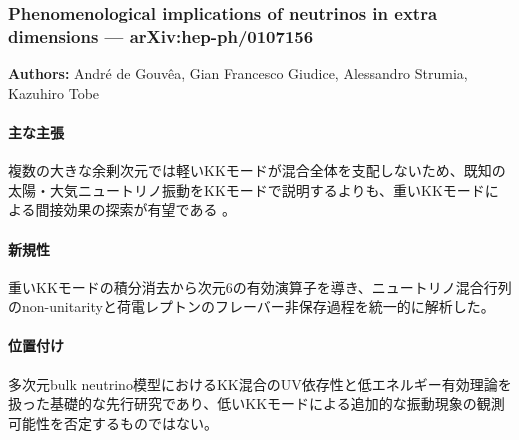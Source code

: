 \subsubsection{Phenomenological implications of neutrinos in extra dimensions --- arXiv:hep-ph/0107156}

\textbf{Authors:} Andr\'e de Gouv\^ea, Gian Francesco Giudice, Alessandro Strumia, Kazuhiro Tobe

\paragraph{主な主張}
複数の大きな余剰次元では軽いKKモードが混合全体を支配しないため、既知の太陽・大気ニュートリノ振動をKKモードで説明するよりも、重いKKモードによる間接効果の探索が有望である \cite{deGouvea:2001ExtraDimensions}。

\paragraph{新規性}
重いKKモードの積分消去から次元6の有効演算子を導き、ニュートリノ混合行列のnon-unitarityと荷電レプトンのフレーバー非保存過程を統一的に解析した。

\paragraph{位置付け}
多次元bulk neutrino模型におけるKK混合のUV依存性と低エネルギー有効理論を扱った基礎的な先行研究であり、低いKKモードによる追加的な振動現象の観測可能性を否定するものではない。
